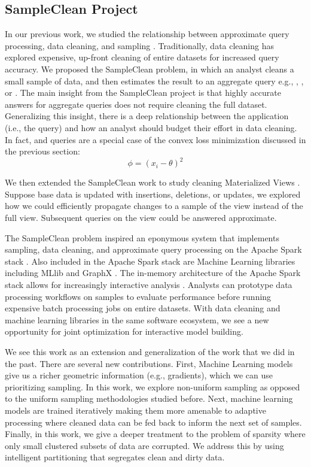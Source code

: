 \subsection{SampleClean Project}
In our previous work, we studied the relationship between approximate query processing, data cleaning, and sampling \cite{wang1999sample, technicalReport}.
Traditionally, data cleaning has explored expensive, up-front cleaning of entire datasets for increased query accuracy.
We proposed the SampleClean problem, in which an analyst cleans a small sample of data, and then estimates the result to an aggregate query e.g., \sumfunc, \countfunc, or \avgfunc.
The main insight from the SampleClean project is that highly accurate answers for aggregate queries does not require cleaning the full dataset.
Generalizing this insight, there is a deep relationship between the application (i.e., the query) and how an analyst should budget their effort in data cleaning.
In fact, \avgfunc and \sumfunc queries are a special case of the convex loss minimization discussed in the previous section:
\[
\phi = (x_{i} - \theta)^2
\]

We then extended the SampleClean work to study cleaning Materialized Views \cite{technicalReport}.
Suppose base data is updated with insertions, deletions, or updates, we explored how we could efficiently propagate
changes to a sample of the view instead of the full view.
Subsequent queries on the view could be answered approximate.

The SampleClean problem inspired an eponymous system that implements sampling, data cleaning, and approximate query processing on the Apache Spark stack \cite{sampleclean}.
Also included in the Apache Spark stack are Machine Learning libraries including MLlib \cite{mllib} and GraphX \cite{graphx}.
The in-memory architecture of the Apache Spark stack allows for increasingly interactive analysis \cite{AgarwalMPMMS13, armbrust2015spark}.
Analysts can prototype data processing workflows on samples to evaluate performance before running expensive batch processing jobs on entire datasets.
With data cleaning and machine learning libraries in the same software ecosystem, we see a new opportunity for joint optimization for interactive model building.

We see this work as an extension and generalization of the work that we did in the past.
There are several new contributions.
First, Machine Learning models give us a richer geometric information (e.g., gradients), which we can use 
prioritizing sampling.
In this work, we explore non-uniform sampling as opposed to the uniform sampling methodologies studied before.
Next, machine learning models are trained iteratively making them more amenable to adaptive processing where cleaned data can be fed back to inform the next set of samples.
Finally, in this work, we give a deeper treatment to the problem of sparsity where only small clustered subsets of data are corrupted.
We address this by using intelligent partitioning that segregates clean and dirty data.

